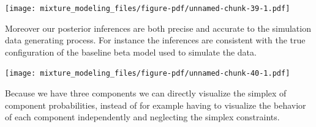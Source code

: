 \documentclass[
  letterpaper,
  DIV=11,
  numbers=noendperiod]{scrartcl}
\newenvironment{Shaded}{\begin{snugshade}}{\end{snugshade}}
\newcommand{\AttributeTok}[1]{\textcolor[rgb]{0.40,0.45,0.13}{#1}}
\newcommand{\DecValTok}[1]{\textcolor[rgb]{0.68,0.00,0.00}{#1}}
\newcommand{\FunctionTok}[1]{\textcolor[rgb]{0.28,0.35,0.67}{#1}}
\newcommand{\NormalTok}[1]{\textcolor[rgb]{0.00,0.23,0.31}{#1}}
\newcommand{\SpecialCharTok}[1]{\textcolor[rgb]{0.37,0.37,0.37}{#1}}
\newcommand{\StringTok}[1]{\textcolor[rgb]{0.13,0.47,0.30}{#1}}
\begin{document}
\texttt{[image: mixture\_modeling\_files/figure-pdf/unnamed-chunk-39-1.pdf]}

Moreover our posterior inferences are both precise and accurate to the
simulation data generating process. For instance the inferences are
consistent with the true configuration of the baseline beta model used
to simulate the data.

\begin{Shaded}
\end{Shaded}

\texttt{[image: mixture\_modeling\_files/figure-pdf/unnamed-chunk-40-1.pdf]}

Because we have three components we can directly visualize the simplex
of component probabilities, instead of for example having to visualize
the behavior of each component independently and neglecting the simplex
constraints.
\end{document}
